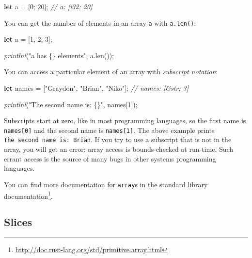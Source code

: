 \documentclass[a4paper,]{book}
\newenvironment{Shaded}{\begin{snugshade}}{\end{snugshade}}
\newcommand{\KeywordTok}[1]{\textcolor[rgb]{0.13,0.29,0.53}{\textbf{{#1}}}}
\newcommand{\DecValTok}[1]{\textcolor[rgb]{0.00,0.00,0.81}{{#1}}}
\newcommand{\StringTok}[1]{\textcolor[rgb]{0.31,0.60,0.02}{{#1}}}
\newcommand{\CommentTok}[1]{\textcolor[rgb]{0.56,0.35,0.01}{\textit{{#1}}}}
\newcommand{\PreprocessorTok}[1]{\textcolor[rgb]{0.56,0.35,0.01}{\textit{{#1}}}}
\newcommand{\NormalTok}[1]{{#1}}
\renewcommand{\href}[2]{#2\footnote{\url{#1}}}
\begin{document}
\begin{Shaded}
\begin{Highlighting}[]
\KeywordTok{let} \NormalTok{a = [}\DecValTok{0}\NormalTok{; }\DecValTok{20}\NormalTok{]; }\CommentTok{// a: [i32; 20]}
\end{Highlighting}
\end{Shaded}

You can get the number of elements in an array \texttt{a} with
\texttt{a.len()}:

\begin{Shaded}
\begin{Highlighting}[]
\KeywordTok{let} \NormalTok{a = [}\DecValTok{1}\NormalTok{, }\DecValTok{2}\NormalTok{, }\DecValTok{3}\NormalTok{];}

\PreprocessorTok{println!}\NormalTok{(}\StringTok{"a has \{\} elements"}\NormalTok{, a.len());}
\end{Highlighting}
\end{Shaded}

You can access a particular element of an array with \emph{subscript
notation}:

\begin{Shaded}
\begin{Highlighting}[]
\KeywordTok{let} \NormalTok{names = [}\StringTok{"Graydon"}\NormalTok{, }\StringTok{"Brian"}\NormalTok{, }\StringTok{"Niko"}\NormalTok{]; }\CommentTok{// names: [&str; 3]}

\PreprocessorTok{println!}\NormalTok{(}\StringTok{"The second name is: \{\}"}\NormalTok{, names[}\DecValTok{1}\NormalTok{]);}
\end{Highlighting}
\end{Shaded}

Subscripts start at zero, like in most programming languages, so the
first name is \texttt{names{[}0{]}} and the second name is
\texttt{names{[}1{]}}. The above example prints
\texttt{The\ second\ name\ is:\ Brian}. If you try to use a subscript
that is not in the array, you will get an error: array access is
bounds-checked at run-time. Such errant access is the source of many
bugs in other systems programming languages.

You can find more documentation for \texttt{array}s
\href{http://doc.rust-lang.org/std/primitive.array.html}{in the standard
library documentation}.

\subsection{Slices}\label{slices}
\end{document}
